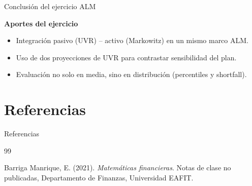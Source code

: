 \documentclass[10pt]{beamer}
\begin{document}
\begin{frame}{Conclusión del ejercicio ALM}
\small
\begin{center}
\end{center}

\vspace{0.35cm}
\textbf{Aportes del ejercicio}
\begin{itemize}
    \item Integración pasivo (UVR) -- activo (Markowitz) en un mismo marco ALM.
    \item Uso de dos proyecciones de UVR para contrastar sensibilidad del plan.
    \item Evaluación no solo en media, sino en distribución (percentiles y shortfall).
\end{itemize}
\end{frame}


\section{Referencias}
\begin{frame}{Referencias}
\begin{thebibliography}{99}

Barriga Manrique, E. (2021).
\newblock \textit{Matemáticas financieras}.
\newblock Notas de clase no publicadas, Departamento de Finanzas, Universidad EAFIT.

\end{thebibliography}
\end{frame}
\end{document}
